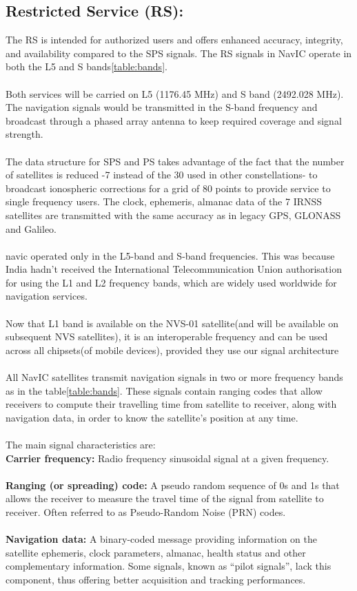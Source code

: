 \documentclass{article}
\begin{document}
\subsection{Restricted Service (RS):}
The RS is intended for authorized users and offers enhanced accuracy, integrity, and availability compared to the SPS signals. The RS signals in NavIC operate in both the L5 and S bands\ref{table:bands}.
	\\
	\\
Both services will be carried on L5 (1176.45 MHz) and S band (2492.028 MHz). The navigation signals would be transmitted in the S-band frequency and broadcast through a phased array antenna to keep required coverage and signal strength.
\\
\\
The data structure for SPS and PS takes advantage of the fact that the number of satellites is reduced -7 instead of the 30 used in other constellations- to broadcast ionospheric corrections for a grid of 80 points to provide service to single frequency users. The clock, ephemeris, almanac data of the 7 IRNSS satellites are transmitted with the same accuracy as in legacy GPS, GLONASS and Galileo.
\\
\\
navic operated only in the L5-band and S-band frequencies. This was because India hadn't received the International Telecommunication Union authorisation for using the L1 and L2 frequency bands, which are widely used worldwide for navigation services.
\\
\\
Now that L1 band is available on the NVS-01 satellite(and will be available on subsequent NVS satellites), it is an interoperable frequency and can be used across all chipsets(of mobile devices), provided they use our signal architecture
\\\\
All NavIC satellites transmit navigation signals in two or more frequency bands as in the table\ref{table:bands}. These signals contain ranging codes that allow receivers to compute their travelling time from satellite to receiver, along with navigation data, in order to know the satellite’s position at any time. \\
\\The main signal characteristics are:
\\
\textbf{Carrier frequency:} Radio frequency sinusoidal signal at a given frequency.
\\\\
\textbf{Ranging (or spreading) code:} A pseudo random sequence of 0s and 1s that allows the receiver to measure the travel time of the signal from satellite to receiver. Often referred to as Pseudo-Random Noise (PRN) codes.
\\\\
\textbf{Navigation data:} A binary-coded message providing information on the satellite ephemeris, clock parameters, almanac, health status and other complementary information. Some signals, known as “pilot signals”, lack this component, thus offering better acquisition and tracking performances.
\end{document}
